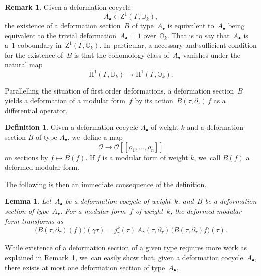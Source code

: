 \documentclass[10pt,a4paper]{article}
\numberwithin{equation}{section}
\let\oldbullet\bullet
\renewcommand{\bullet}{{\scriptscriptstyle\oldbullet}}
\theoremstyle{plain}
\newtheorem{lemma}[theoremcounter]{Lemma}
\theoremstyle{definition}
\newtheorem{definition}[theoremcounter]{Definition}
\newtheorem{remark}[theoremcounter]{Remark}
\newcommand{\tx}{\text}
\newcommand{\bbD}{\ensuremath{\mathbb{D}}}
\newcommand{\bbO}{\ensuremath{\mathbb{O}}}
\newcommand{\cO}{\ensuremath{\mathcal{O}}}
\newcommand{\rmH}{\ensuremath{\mathrm{H}}}
\newcommand{\rmZ}{\ensuremath{\mathrm{Z}}}
\newcommand{\llbrkt}{[\![}
\newcommand{\rrbrkt}{]\!]}
\let\Ga\Gamma
\let\ga\gamma
\begin{document}
\begin{remark}
\label{rm:algebraic_deformation_section_existence}
Given a deformation cocycle
\begin{equation*}A_\bullet\in \rmZ^1(\Ga,\bbD_k),\end{equation*}
the existence of a deformation section~$B$ of type~$A_\bullet$ is equivalent to~$A_\bullet$ being equivalent to the trivial deformation~$A_\bullet=1$ over~$\bbO_k$. That is to say that~$A_\bullet$ is a~$1$-coboundary in~$\rmZ^1(\Ga,\bbO_k)$. In~particular, a necessary and sufficient condition for the existence of~$B$ is that the cohomology class of~$A_\bullet$ vanishes under the natural map
\begin{equation*}\rmH^1(\Ga,\bbD_k) \to \rmH^1(\Ga,\bbO_k)\tx{.}\end{equation*}
\end{remark}

Parallelling the situation of first order deformations, a deformation section~$B$ yields a deformation of a modular form~$f$ by its action~$B(\tau, \partial_\tau)\, f$ as a differential operator.

\begin{definition}\label{def:deformed-forms}
Given a deformation cocycle $A_\bullet$ of weight $k$ and a deformation section $B$ of type $A_\bullet$, we~define a map
\begin{equation*}\cO\to \cO \llbrkt \rho_1,\ldots,\rho_n\rrbrkt\end{equation*}
on sections by $f\mapsto B(f)$. If $f$ is a modular form of weight $k$, we~call $B(f)$ a deformed modular form.
\end{definition}

The following is then an immediate consequence of the definition.

\begin{lemma}
\label{lem:deformed-transformation}
Let~$A_\bullet$ be a deformation cocycle of weight~$k$, and~$B$ be a deformation section of type~$A_\bullet$. For a modular form~$f$ of weight~$k$, the deformed modular form transforms as
\begin{equation*}
\bigl(B(\tau, \partial_\tau)(f) \bigr)(\ga\tau)
=
j_\gamma^{k}(\tau)\, A_\ga(\tau, \partial_\tau)\, \bigl(B(\tau, \partial_\tau) f \bigr)(\tau)
\tx{.}
\end{equation*}
\end{lemma}

While existence of a deformation section of a given type requires more work as explained in Remark~\ref{rm:algebraic_deformation_section_existence}, we~can easily show that, given a deformation cocycle~$A_\bullet$, there exists at most one deformation section of type~$A_\bullet$.
\end{document}
